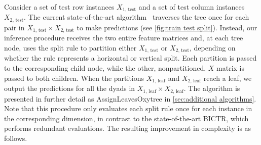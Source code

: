 \documentclass[letterpaper]{article}
\begin{document}
Consider a set of test row instances $X_\text{1, test}$ and a set of test column instances $X_\text{2, test}$.
The current state-of-the-art algorithm~\cite{pliakos_global_2018} traverses the tree once for each pair in $X_\text{1, test} \times X_\text{2, test}$ to make predictions (see \cref{fig:train test split}). Instead, our inference procedure receives the two entire feature matrices and, at each tree node, uses the split rule to partition either $X_\text{1, test}$ or $X_\text{2, test}$, depending on whether the rule represents a horizontal or vertical split. Each partition is passed to the corresponding child node, while the other, nonpartitioned, $X$ matrix is passed to both children. When the partitions $X_\text{1, leaf}$ and $X_\text{2, leaf}$ reach a leaf, we output the predictions for all the dyads in $X_\text{1, leaf} \times X_\text{2, leaf}$.
The algorithm is presented in further detail as
AssignLeavesOxytree
in \cref{sec:additional algorithms}.
Note that this procedure only evaluates each split rule once for each instance in the corresponding dimension, in contrast to the state-of-the-art BICTR, which performs redundant evaluations.
The resulting improvement in complexity is as follows.
\end{document}
